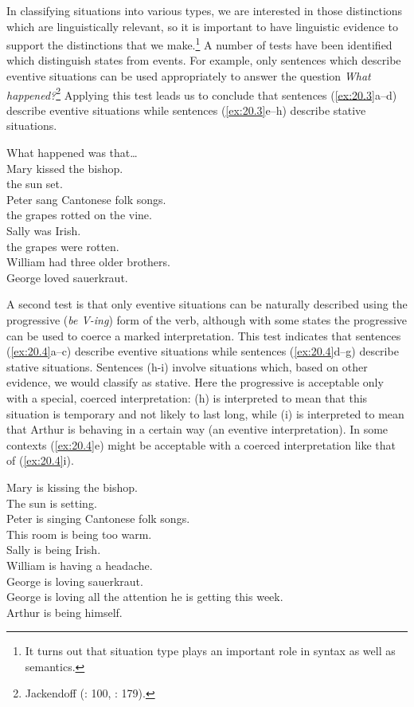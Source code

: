 In classifying situations into various types, we are interested in those distinctions which are linguistically relevant, so it is important to have linguistic evidence to support the distinctions that we make.\footnote{It turns out that situation type plays an important role in syntax as well as semantics.} A number of tests have been identified which distinguish states from events. For example, only sentences which describe eventive situations can be used appropriately to answer the question \textit{What happened?}\footnote{Jackendoff (\citeyear{Jackendoff1976}: 100, \citeyear{Jackendoff1983}: 179).} Applying this test leads us to conclude that sentences (\ref{ex:20.3}a--d) describe eventive situations while sentences (\ref{ex:20.3}e--h) describe stative situations.


\ea \label{ex:20.3}
What happened was that…\\
\ea  Mary kissed the bishop.\\
\ex the sun set.\\
\ex Peter sang Cantonese folk songs.\\
\ex the grapes rotted on the vine.\\
\ex *Sally was Irish.\\
\ex *the grapes were rotten.\\
\ex *William had three older brothers.\\
\ex *George loved sauerkraut.
                       \z
\z


A second test is that only eventive situations can be naturally described using the progressive (\textit{be V-ing}) form of the verb, although with some states the progressive can be used to coerce a marked interpretation. This test indicates that sentences (\ref{ex:20.4}a--c) describe eventive situations while sentences (\ref{ex:20.4}d--g) describe stative situations. Sentences (h-i) involve situations which, based on other evidence, we would classify as stative. Here the progressive is acceptable only with a special, coerced interpretation: (h) is interpreted to mean that this situation is temporary and not likely to last long, while (i) is interpreted to mean that Arthur is behaving in a certain way (an eventive interpretation). In some contexts (\ref{ex:20.4}e) might be acceptable with a coerced interpretation like that of (\ref{ex:20.4}i).


\ea \label{ex:20.4}
\ea  Mary is kissing the bishop.\\
\ex The sun is setting.\\
\ex Peter is singing Cantonese folk songs.\\
\ex *This room is being too warm.\\
\ex *Sally is being Irish.\\
\ex *William is having a headache.\\
\ex *George is loving sauerkraut.\\
\ex George is loving all the attention he is getting this week.\\
\ex Arthur is being himself.
                       \z
\z


